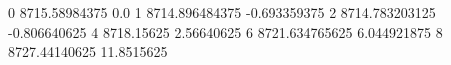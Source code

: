 0 8715.58984375 0.0
1 8714.896484375 -0.693359375
2 8714.783203125 -0.806640625
4 8718.15625 2.56640625
6 8721.634765625 6.044921875
8 8727.44140625 11.8515625
